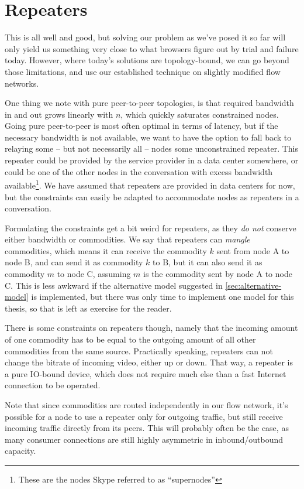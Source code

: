 \section{Repeaters}\label{sec:repeaters}

This is all well and good, but solving our problem as we've posed it so far will only yield us something very close to what browsers figure out by trial and failure today. However, where today's solutions are topology-bound, we can go beyond those limitations, and use our established technique on slightly modified flow networks.

One thing we note with pure peer-to-peer topologies, is that required bandwidth in and out grows linearly with $n$, which quickly saturates constrained nodes. Going pure peer-to-peer is most often optimal in terms of latency, but if the necessary bandwidth is not available, we want to have the option to fall back to relaying some -- but not necessarily all -- nodes some unconstrained repeater. This repeater could be provided by the service provider in a data center somewhere, or could be one of the other nodes in the conversation with excess bandwidth available\footnote{These are the nodes Skype referred to as ``supernodes''}. We have assumed that repeaters are provided in data centers for now, but the constraints can easily be adapted to accommodate nodes as repeaters in a conversation.

Formulating the constraints get a bit weird for repeaters, as they \emph{do not} conserve either bandwidth or commodities. We say that repeaters can \emph{mangle} commodities, which means it can receive the commodity $k$ sent from node A to node B, and can send it as commodity $k$ to B, but it can also send it as commodity $m$ to node C, assuming $m$ is the commodity sent by node A to node C. This is less awkward if the alternative model suggested in \autoref{sec:alternative-model} is implemented, but there was only time to implement one model for this thesis, so that is left as exercise for the reader.

There is some constraints on repeaters though, namely that the incoming amount of one commodity has to be equal to the outgoing amount of all other commodities from the same source. Practically speaking, repeaters can not change the bitrate of incoming video, either up or down. That way, a repeater is a pure IO-bound device, which does not require much else than a fast Internet connection to be operated.

Note that since commodities are routed independently in our flow network, it's possible for a node to use a repeater only for outgoing traffic, but still receive incoming traffic directly from its peers. This will probably often be the case, as many consumer connections are still highly asymmetric in inbound/outbound capacity.

